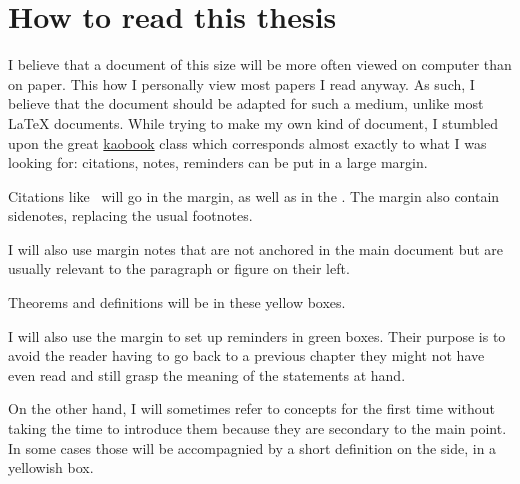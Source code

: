 \chapter{How to read this thesis}

I believe that a document of this size will be more often viewed on computer
than on paper. This how I personally view most papers I read anyway.
As such, I believe that the document should be adapted for such a medium, unlike
most \LaTeX{} documents.
While trying to make my own kind of document, I stumbled upon the great
\href{https://github.com/fmarotta/kaobook/}{kaobook} class which corresponds
almost exactly to what I was looking for: citations, notes, reminders can be put
in a large margin.

Citations like~ will go in the
margin, as well as in the .
The margin also contain sidenotes, replacing the usual footnotes.

I will also use margin notes that are not anchored in the main document but are
usually relevant to the paragraph or figure on their left.

\begin{theorem}
  Theorems and definitions will be in these yellow boxes.
\end{theorem}

I will also use the margin to set up reminders in green boxes. Their purpose
is to avoid the reader having to go back to a previous chapter they might not
have even read and still grasp the meaning of the statements at hand.

On the other hand, I will sometimes refer to concepts for the first time without
taking the time to introduce them because they are secondary to the main point.
In some cases those will be accompagnied by a short definition on the side, in
a yellowish box.